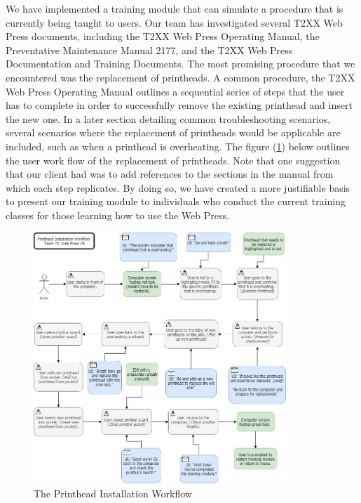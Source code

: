 \documentclass[onecolumn, draftclsnofoot,10pt, compsoc]{IEEEtran}
\begin{document}
We have implemented a training module that can simulate a procedure that is currently being taught to users. Our team has investigated several T2XX Web Press documents, including the T2XX Web Press Operating Manual, the Preventative Maintenance Manual 2177, and the T2XX Web Press Documentation and Training Documents. The most promising procedure that we encountered was the replacement of printheads. A common procedure, the T2XX Web Press Operating Manual outlines a sequential series of steps that the user has to complete in order to successfully remove the existing printhead and insert the new one. In a later section detailing common troubleshooting scenarios, several scenarios where the replacement of printheads would be applicable are included, such as when a printhead is overheating. The figure (\ref{fig:workflow}) below outlines the user work flow of the replacement of printheads. Note that one suggestion that our client had was to add references to the sections in the manual from which each step replicates. By doing so, we have created a more justifiable basis to present our training module to individuals who conduct the current training classes for those learning how to use the Web Press.

\begin{figure}[ht!]
    \centering
    \includegraphics[width=0.85\textwidth]{PrintheadInstallationWorkflow.jpg}
    \caption{The Printhead Installation Workflow}
    \label{fig:workflow}
\end{figure}
\end{document}
